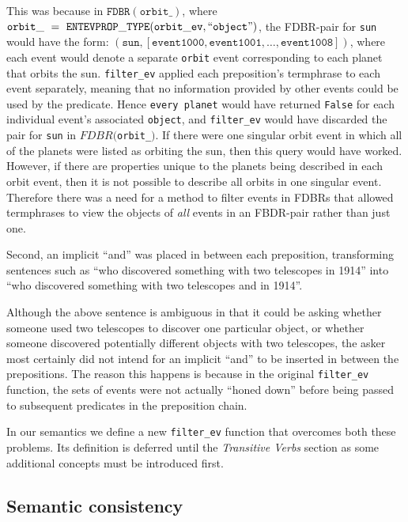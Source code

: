 \documentclass[../main.tex]{subfiles}
\begin{document}
This was because in $\mathtt{FDBR}(\mathtt{orbit\_})$, where $\mathtt{orbit\_}\ =\ \mathtt{ENTEVPROP\_TYPE}(\mathtt{orbit\_ev},\allowbreak \text{``\texttt{object}''})$, the FDBR-pair for \texttt{sun} would have the form: $(\mathtt{sun}, [\mathtt{event1000}, \mathtt{event1001} , \allowbreak \dots , \mathtt{event1008} ])$, where each event would denote a separate \texttt{orbit} event corresponding to each planet that orbits the sun.  \texttt{filter\_ev} applied each preposition's termphrase to each event separately, meaning that no information provided by other events could be used by the predicate.  Hence \texttt{every planet} would have returned \texttt{False} for each individual event's associated \texttt{object}, and \texttt{filter\_ev} would have discarded the pair for \texttt{sun} in $FDBR($\texttt{orbit\_}$)$.  If there were one singular orbit event in which all of the planets were listed as orbiting the sun, then this query would have worked.  However, if there are properties unique to the planets being described in each orbit event, then it is not possible to describe all orbits in one singular event.  Therefore there was a need for a method to filter events in FDBRs that allowed termphrases to view the objects of {\em all} events in an FBDR-pair rather than just one.  

Second, an implicit ``and'' was placed in between each preposition, transforming sentences such as ``who discovered something with two telescopes in 1914'' into ``who discovered something with two telescopes and in 1914''.

Although the above sentence is ambiguous in that it could be asking whether someone used two telescopes to discover one particular object, or whether
someone discovered potentially different objects with two telescopes, the asker most certainly did not intend for an implicit ``and'' to be inserted in between the prepositions.
The reason this happens is because in the original \texttt{filter\_ev} function, the sets of events were not actually ``honed down'' before being passed to subsequent predicates in the preposition chain.

In our semantics we define a new \texttt{filter\_ev} function that overcomes
both these problems.  Its definition is deferred until the {\em Transitive Verbs}
section as some additional concepts must be introduced first.

\subsection{Semantic consistency}
\end{document}
